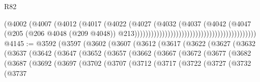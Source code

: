 \begin{lexlean}{R82}
\begin{coremodule}
                                                                      (@4002
                                                                        (@4007
                                                                          (@4012
                                                                            (@4017
                                                                              (@4022
                                                                                (@4027
                                                                                  (@4032
                                                                                    (@4037
                                                                                      (@4042
                                                                                        (@4047
                                                                                          (@205
                                                                                            (@206
                                                                                              @4048
                                                                                              (@209
                                                                                                @4048))
                                                                                            @213))))))))))))))))))))))))))))))))))))))))))))
@4145 := @3592
    (@3597
      (@3602
        (@3607
          (@3612
            (@3617
              (@3622
                (@3627
                  (@3632
                    (@3637
                      (@3642
                        (@3647
                          (@3652
                            (@3657
                              (@3662
                                (@3667
                                  (@3672
                                    (@3677
                                      (@3682
                                        (@3687
                                          (@3692
                                            (@3697
                                              (@3702
                                                (@3707
                                                  (@3712
                                                    (@3717
                                                      (@3722
                                                        (@3727
                                                          (@3732
                                                            (@3737

\end{coremodule}
\end{lexlean}
